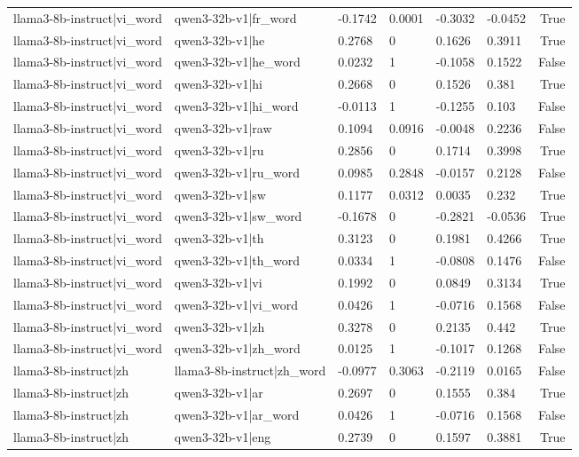 \begin{table}
\begin{tabular}{llllllr}
llama3-8b-instruct|vi_word & qwen3-32b-v1|fr_word & -0.1742 & 0.0001 & -0.3032 & -0.0452 & True \\
llama3-8b-instruct|vi_word & qwen3-32b-v1|he & 0.2768 & 0 & 0.1626 & 0.3911 & True \\
llama3-8b-instruct|vi_word & qwen3-32b-v1|he_word & 0.0232 & 1 & -0.1058 & 0.1522 & False \\
llama3-8b-instruct|vi_word & qwen3-32b-v1|hi & 0.2668 & 0 & 0.1526 & 0.381 & True \\
llama3-8b-instruct|vi_word & qwen3-32b-v1|hi_word & -0.0113 & 1 & -0.1255 & 0.103 & False \\
llama3-8b-instruct|vi_word & qwen3-32b-v1|raw & 0.1094 & 0.0916 & -0.0048 & 0.2236 & False \\
llama3-8b-instruct|vi_word & qwen3-32b-v1|ru & 0.2856 & 0 & 0.1714 & 0.3998 & True \\
llama3-8b-instruct|vi_word & qwen3-32b-v1|ru_word & 0.0985 & 0.2848 & -0.0157 & 0.2128 & False \\
llama3-8b-instruct|vi_word & qwen3-32b-v1|sw & 0.1177 & 0.0312 & 0.0035 & 0.232 & True \\
llama3-8b-instruct|vi_word & qwen3-32b-v1|sw_word & -0.1678 & 0 & -0.2821 & -0.0536 & True \\
llama3-8b-instruct|vi_word & qwen3-32b-v1|th & 0.3123 & 0 & 0.1981 & 0.4266 & True \\
llama3-8b-instruct|vi_word & qwen3-32b-v1|th_word & 0.0334 & 1 & -0.0808 & 0.1476 & False \\
llama3-8b-instruct|vi_word & qwen3-32b-v1|vi & 0.1992 & 0 & 0.0849 & 0.3134 & True \\
llama3-8b-instruct|vi_word & qwen3-32b-v1|vi_word & 0.0426 & 1 & -0.0716 & 0.1568 & False \\
llama3-8b-instruct|vi_word & qwen3-32b-v1|zh & 0.3278 & 0 & 0.2135 & 0.442 & True \\
llama3-8b-instruct|vi_word & qwen3-32b-v1|zh_word & 0.0125 & 1 & -0.1017 & 0.1268 & False \\
llama3-8b-instruct|zh & llama3-8b-instruct|zh_word & -0.0977 & 0.3063 & -0.2119 & 0.0165 & False \\
llama3-8b-instruct|zh & qwen3-32b-v1|ar & 0.2697 & 0 & 0.1555 & 0.384 & True \\
llama3-8b-instruct|zh & qwen3-32b-v1|ar_word & 0.0426 & 1 & -0.0716 & 0.1568 & False \\
llama3-8b-instruct|zh & qwen3-32b-v1|eng & 0.2739 & 0 & 0.1597 & 0.3881 & True \\

\end{tabular}
\end{table}
